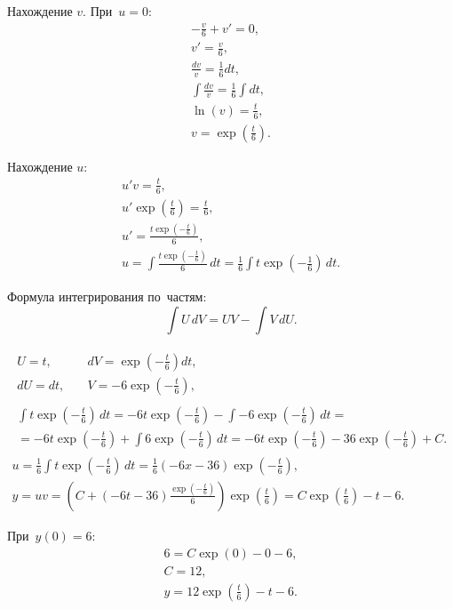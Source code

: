 \documentclass[10pt, a4paper, titlepage]{article}
\begin{document}
Нахождение $v$. При~$u=0$:
\begin{gather*}
    -\frac{v}{6}+v'=0 ,\\
    v'=\frac{v}{6} ,\\
    \frac{dv}{v}=\frac{1}{6}dt ,\\
    \int\frac{dv}{v}=\frac{1}{6}\int dt ,\\
    \ln(v)=\frac{t}{6} ,\\
    v=\exp\left(\frac{t}{6}\right) .
\end{gather*}

Нахождение $u$:
\begin{gather*}
    u'v=\frac{t}{6} ,\\
    u'\exp\left(\frac{t}{6}\right)=\frac{t}{6} ,\\
    u'=\frac{t\exp\left(-\frac{t}{6}\right)}{6} ,\\
    u=\int\frac{t\exp\left(-\frac{t}{6}\right)}{6}\,dt = \frac{1}{6}\int t\exp\left(-\frac{1}{6}\right)\,dt .
\end{gather*}

Формула интегрирования по~частям:
$$\int U\,dV = UV - \int V \,dU .$$

\begin{gather*}
    \begin{aligned}
        U=t , &\quad dV=\exp\left(-\frac{t}{6}\right)dt ,\\
        dU=dt , &\quad V=-6\exp\left(-\frac{t}{6}\right) ,
    \end{aligned} 
    \\
    \begin{multlined}
        \int t\exp\left(-\frac{t}{6}\right)\,dt=-6t\exp\left(-\frac{t}{6}\right)-\int-6\exp\left(-\frac{t}{6}\right)\,dt = \\
        = -6t\exp\left(-\frac{t}{6}\right)+\int6\exp\left(-\frac{t}{6}\right)\,dt=-6t\exp\left(-\frac{t}{6}\right)-36\exp\left(-\frac{t}{6}\right)+C .
    \end{multlined}
    \\
    u=\frac{1}{6}\int t\exp\left(-\frac{t}{6}\right)\,dt = \frac{1}{6}(-6x-36)\exp\left(-\frac{t}{6}\right) ,\\
    y=uv=\left(C+(-6t-36)\frac{\exp\left(-\frac{t}{6}\right)}{6}\right)\exp\left(\frac{t}{6}\right)=C\exp\left(\frac{t}{6}\right)-t-6 .
\end{gather*}

При~$y(0)=6$:
\begin{gather*}
    6 = C\exp(0)-0-6 ,\\
    C = 12 ,\\
    y = 12\exp\left(\frac{t}{6}\right)-t-6 .
\end{gather*}
\end{document}
